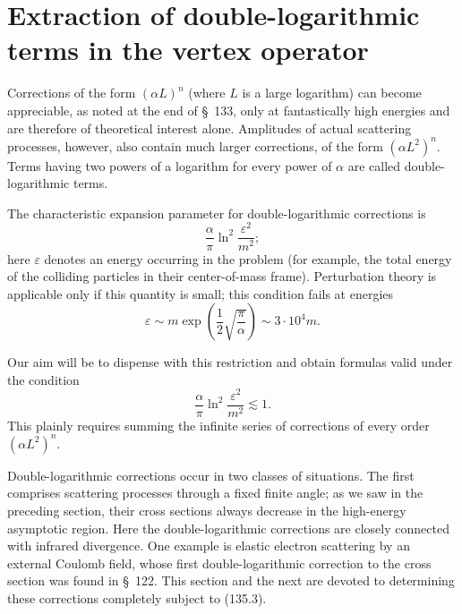 \section{Extraction of double-logarithmic terms in the vertex operator}

Corrections of the form $(\alpha L)^n$ (where $L$ is a large logarithm) can become appreciable, as noted at the end of \S~133, only at fantastically high energies and are therefore of theoretical interest alone. Amplitudes of actual scattering processes, however, also contain much larger corrections, of the form $(\alpha L^2)^n$. Terms having two powers of a logarithm for every power of $\alpha$ are called double-logarithmic terms.

The characteristic expansion parameter for double-logarithmic corrections is
\begin{equation}
\frac{\alpha}{\pi}\ln^2\frac{\varepsilon^2}{m^2};
\tag{135.1}
\end{equation}
here $\varepsilon$ denotes an energy occurring in the problem (for example, the total energy of the colliding particles in their center-of-mass frame). Perturbation theory is applicable only if this quantity is small; this condition fails at energies
\begin{equation}
\varepsilon\sim m\exp\left(\frac{1}{2}\sqrt{\frac{\pi}{\alpha}}\right)\sim3\cdot10^4m.
\tag{135.2}
\end{equation}

Our aim will be to dispense with this restriction and obtain formulas valid under the condition
\begin{equation}
\frac{\alpha}{\pi}\ln^2\frac{\varepsilon^2}{m^2}\lesssim1.
\tag{135.3}
\end{equation}
This plainly requires summing the infinite series of corrections of every order $(\alpha L^2)^n$.

Double-logarithmic corrections occur in two classes of situations. The first comprises scattering processes through a fixed finite angle; as we saw in the preceding section, their cross sections always decrease in the high-energy asymptotic region. Here the double-logarithmic corrections are closely connected with infrared divergence. One example is elastic electron scattering by an external Coulomb field, whose first double-logarithmic correction to the cross section was found in \S~122. This section and the next are devoted to determining these corrections completely subject to (135.3).

